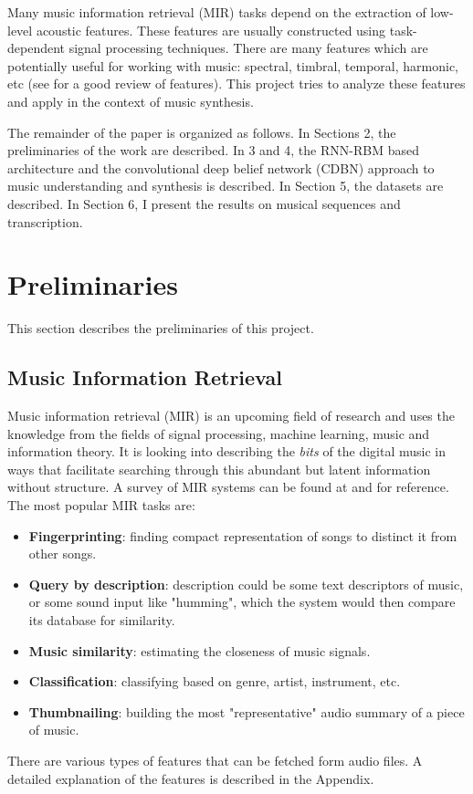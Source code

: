 \documentclass[letterpaper, 10 pt, conference]{ieeeconf}
\begin{document}
Many music information retrieval (MIR) tasks depend on the extraction of low-level acoustic features. These features are usually constructed using task-dependent signal processing techniques. There are many features which are potentially useful for working with music: spectral, timbral, temporal, harmonic, etc (see \cite{c3} for a good review of features). This project tries to analyze these features and apply in the context of music synthesis. 

The remainder of the paper is organized as follows. In Sections 2, the preliminaries of the work are described. In 3 and 4, the RNN-RBM based architecture and the convolutional deep belief network (CDBN) approach to music understanding and synthesis is described. In Section 5, the datasets are described. In Section 6, I present the results on musical sequences and transcription.

\section{Preliminaries}
This section describes the preliminaries of this project. %
\subsection{Music Information Retrieval}
Music information retrieval (MIR) is an upcoming field of research and uses the knowledge from the fields of signal processing, machine learning, music and information theory. It is looking into describing the {\it bits} of the digital music in ways that facilitate searching through this abundant but latent information without structure. A survey of MIR systems can be found at \cite{c6} and \cite{c7} for reference. The most popular MIR tasks are:
\begin{itemize}
\item {\bf Fingerprinting}: finding compact representation of songs to distinct it from other songs.
\item {\bf Query by description}: description could be some text descriptors of music, or some sound input like "humming", which the system would then compare its database for similarity.
\item {\bf Music similarity}: estimating the closeness of music signals.
\item {\bf Classification}: classifying based on genre, artist, instrument, etc. 
\item {\bf Thumbnailing}: building the most "representative" audio summary of a piece of music.
\end{itemize}
There are various types of features that can be fetched form audio files. A detailed explanation of the features is described in the Appendix.
\end{document}
